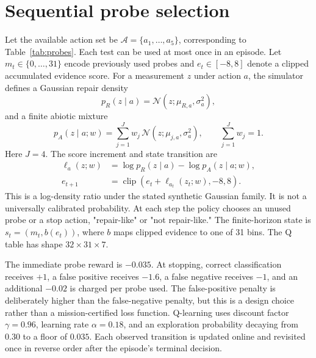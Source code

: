 \documentclass[11pt]{article}
\newcommand{\A}{\mathcal{A}}
\begin{document}
\section{Sequential probe selection}
Let the available action set be $\A=\{a_1,\ldots,a_5\}$, corresponding to Table~\ref{tab:probes}. Each test can be used at most once in an episode. Let $m_t\in\{0,\ldots,31\}$ encode previously used probes and $e_t\in[-8,8]$ denote a clipped accumulated evidence score. For a measurement $z$ under action $a$, the simulator defines a Gaussian repair density
\begin{equation}
 p_R(z\mid a)=\mathcal{N}(z;\mu_{R,a},\sigma_a^2),
 \label{eq:repairdensity}
\end{equation}
and a finite abiotic mixture
\begin{equation}
 p_A(z\mid a;w)=\sum_{j=1}^{J}w_j\,\mathcal{N}(z;\mu_{j,a},\sigma_a^2),\qquad \sum_{j=1}^{J}w_j=1.
 \label{eq:abidensity}
\end{equation}
Here $J=4$. The score increment and state transition are
\begin{align}
 \ell_a(z;w)&=\log p_R(z\mid a)-\log p_A(z\mid a;w),\label{eq:llr}\\
 e_{t+1}&=\operatorname{clip}(e_t+\ell_{a_t}(z_t;w),-8,8).\label{eq:evidence}
\end{align}
This is a log-density ratio under the stated synthetic Gaussian family. It is not a universally calibrated probability. At each step the policy chooses an unused probe or a stop action, "repair-like" or "not repair-like." The finite-horizon state is $s_t=(m_t,b(e_t))$, where $b$ maps clipped evidence to one of 31 bins. The Q table has shape $32\times31\times7$.

The immediate probe reward is $-0.035$. At stopping, correct classification receives $+1$, a false positive receives $-1.6$, a false negative receives $-1$, and an additional $-0.02$ is charged per probe used. The false-positive penalty is deliberately higher than the false-negative penalty, but this is a design choice rather than a mission-certified loss function. Q-learning uses discount factor $\gamma=0.96$, learning rate $\alpha=0.18$, and an exploration probability decaying from $0.30$ to a floor of $0.035$. Each observed transition is updated online and revisited once in reverse order after the episode's terminal decision.
\end{document}
